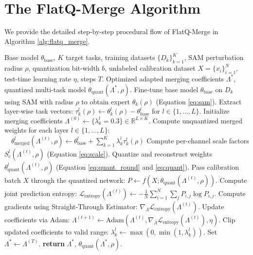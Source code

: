 \documentclass{article}
\theoremstyle{plain}
\theoremstyle{definition}
\theoremstyle{remark}
\begin{document}
\newpage
\section{The FlatQ-Merge Algorithm}
\label{sec:appendix_algorithm}

We provide the detailed step-by-step procedural flow of FlatQ-Merge in Algorithm \ref{alg:flatq_merge}.

\begin{algorithm}[htbp]
\caption{FlatQ-Merge Algorithm}
\label{alg:flatq_merge}
\begin{algorithmic}[1]
\REQUIRE Base model $\theta_{\text{base}}$, $K$ target tasks, training datasets $\{D_k\}_{k=1}^K$, SAM perturbation radius $\rho$, quantization bit-width $b$, unlabeled calibration dataset $X = \{x_i\}_{i=1}^N$, test-time learning rate $\eta$, steps $T$.
\ENSURE Optimized adapted merging coefficients $\Lambda^*$, quantized multi-task model $\theta_{\text{quant}}(\Lambda^*, \rho)$.
\STATE {}
    \STATE Fine-tune base model $\theta_{\text{base}}$ on $D_k$ using SAM with radius $\rho$ to obtain expert $\theta_k(\rho)$ (Equation \ref{eq:sam}).
    \STATE Extract layer-wise task vectors: $\tau^l_k(\rho) \leftarrow \theta^l_k(\rho) - \theta^l_{\text{base}}$ for $l \in \{1, \dots, L\}$.
\ENDFOR
\STATE {}
\STATE Initialize merging coefficients $\Lambda^{(0)} \leftarrow \{\lambda^l_k = 0.3\} \in \mathbb{R}^{L \times K}$.
    \STATE Compute unquantized merged weights for each layer $l \in \{1, \dots, L\}$:
    \STATE $\quad \theta^l_{\text{merged}}\left(\Lambda^{(t)}, \rho\right) \leftarrow \theta^l_{\text{base}} + \sum_{k=1}^K \lambda^l_k \tau^l_k(\rho)$
    \STATE Compute per-channel scale factors $S^l_c\left(\Lambda^{(t)}, \rho\right)$ (Equation \ref{eq:scale}).
    \STATE Quantize and reconstruct weights $\theta^l_{\text{quant}}\left(\Lambda^{(t)}, \rho\right)$ (Equation \ref{eq:quant_round} and \ref{eq:quant}).
    \STATE Pass calibration batch $X$ through the quantized network: $P \leftarrow f\left(X; \theta_{\text{quant}}\left(\Lambda^{(t)}, \rho\right)\right)$.
    \STATE Compute joint prediction entropy: $\mathcal{L}_{\text{entropy}}\left(\Lambda^{(t)}\right) \leftarrow -\frac{1}{N} \sum_{i=1}^N \sum_{j} P_{i,j} \log P_{i,j}$.
    \STATE Compute gradients using Straight-Through Estimator: $\nabla_{\Lambda} \mathcal{L}_{\text{entropy}}\left(\Lambda^{(t)}\right)$.
    \STATE Update coefficients via Adam: $\Lambda^{(t+1)} \leftarrow \text{Adam}\left(\Lambda^{(t)}, \nabla_{\Lambda} \mathcal{L}_{\text{entropy}}\left(\Lambda^{(t)}\right), \eta\right)$.
    \STATE Clip updated coefficients to valid range: $\lambda^l_k \leftarrow \max(0, \min(1, \lambda^l_k))$.
\ENDFOR
\STATE Set $\Lambda^* \leftarrow \Lambda^{(T)}$.
\STATE \textbf{return} $\Lambda^*$, $\theta_{\text{quant}}(\Lambda^*, \rho)$.
\end{algorithmic}
\end{algorithm}
\end{document}
